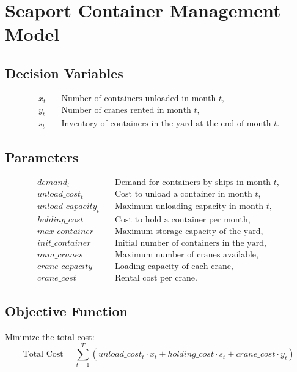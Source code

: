 \documentclass{article}
\begin{document}
\section*{Seaport Container Management Model}

\subsection*{Decision Variables}
\begin{align*}
x_t &\quad \text{Number of containers unloaded in month } t, \\
y_t &\quad \text{Number of cranes rented in month } t, \\
s_t &\quad \text{Inventory of containers in the yard at the end of month } t.
\end{align*}

\subsection*{Parameters}
\begin{align*}
demand_t &\quad \text{Demand for containers by ships in month } t, \\
unload\_cost_t &\quad \text{Cost to unload a container in month } t, \\
unload\_capacity_t &\quad \text{Maximum unloading capacity in month } t, \\
holding\_cost &\quad \text{Cost to hold a container per month}, \\
max\_container &\quad \text{Maximum storage capacity of the yard}, \\
init\_container &\quad \text{Initial number of containers in the yard}, \\
num\_cranes &\quad \text{Maximum number of cranes available}, \\
crane\_capacity &\quad \text{Loading capacity of each crane}, \\
crane\_cost &\quad \text{Rental cost per crane}.
\end{align*}

\subsection*{Objective Function}
Minimize the total cost:
\[
\text{Total Cost} = \sum_{t=1}^{T} \left( unload\_cost_t \cdot x_t + holding\_cost \cdot s_t + crane\_cost \cdot y_t \right)
\]
\end{document}
